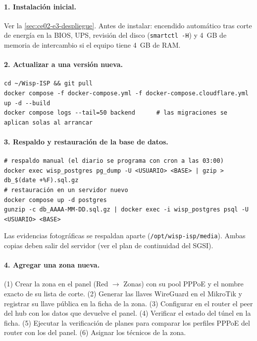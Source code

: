 \paragraph{1. Instalación inicial.} Ver la \cref{sec:ce02-e3-despliegue}. Antes de instalar:
encendido automático tras corte de energía en la BIOS, UPS, revisión del disco
(\texttt{smartctl -H}) y 4~GB de memoria de intercambio si el equipo tiene 4~GB de RAM.

\paragraph{2. Actualizar a una versión nueva.}
\begin{lstlisting}[style=plano]
cd ~/Wisp-ISP && git pull
docker compose -f docker-compose.yml -f docker-compose.cloudflare.yml up -d --build
docker compose logs --tail=50 backend      # las migraciones se aplican solas al arrancar
\end{lstlisting}

\paragraph{3. Respaldo y restauración de la base de datos.}
\begin{lstlisting}[style=plano]
# respaldo manual (el diario se programa con cron a las 03:00)
docker exec wisp_postgres pg_dump -U <USUARIO> <BASE> | gzip > db_$(date +%F).sql.gz
# restauración en un servidor nuevo
docker compose up -d postgres
gunzip -c db_AAAA-MM-DD.sql.gz | docker exec -i wisp_postgres psql -U <USUARIO> <BASE>
\end{lstlisting}
Las evidencias fotográficas se respaldan aparte (\texttt{/opt/wisp-isp/media}). Ambas copias
deben salir del servidor (ver el plan de continuidad del SGSI).

\paragraph{4. Agregar una zona nueva.} (1) Crear la zona en el panel (Red $\rightarrow$
Zonas) con su pool PPPoE y el nombre exacto de su lista de corte. (2) Generar las llaves
WireGuard en el MikroTik y registrar su llave pública en la ficha de la zona. (3) Configurar
en el router el peer del hub con los datos que devuelve el panel. (4) Verificar el estado del
túnel en la ficha. (5) Ejecutar la verificación de planes para comparar los perfiles PPPoE del
router con los del panel. (6) Asignar los técnicos de la zona.


